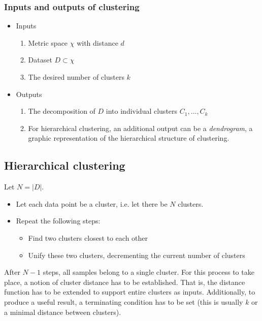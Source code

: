 \documentclass[a4paper]{article}
\begin{document}
	\subsubsection{Inputs and outputs of clustering}
	\begin{itemize}
		\item Inputs
			\begin{enumerate}
				\item Metric space $\chi$ with distance $d$
				\item Dataset $D \subset \chi$
				\item The desired number of clusters $k$
			\end{enumerate}
		\item Outputs
			\begin{enumerate}
				\item The decomposition of $D$ into individual clusters $C_1, \ldots, C_k$
				\item For hierarchical clustering, an additional output can be
					a \textit{dendrogram}, a graphic representation of the hierarchical
					structure of clustering.
			\end{enumerate}
	\end{itemize}

	\subsection{Hierarchical clustering}
	Let $N = |D|$.
	\begin{itemize}
		\item Let each data point be a cluster, i.e. let there be $N$ clusters.
		\item Repeat the following steps:
			\begin{itemize}
				\item Find two clusters closest to each other
				\item Unify these two clusters, decrementing the current number of clusters
			\end{itemize}
	\end{itemize}
	After $N - 1$ steps, all samples belong to a single cluster. For this process to
	take place, a notion of cluster distance has to be established. That is, the
	distance function has to be extended to support entire clusters as inputs.
	Additionally, to produce a useful result, a terminating condition has to be
	set (this is usually $k$ or a minimal distance between clusters).
\end{document}
